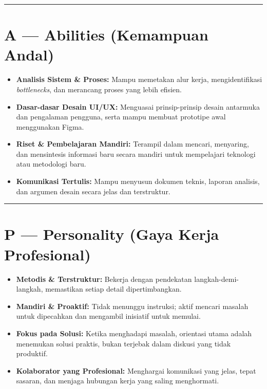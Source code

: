 \documentclass[
  letterpaper,
  DIV=11,
  numbers=noendperiod]{scrreprt}
\providecommand{\tightlist}{%
  \setlength{\itemsep}{0pt}\setlength{\parskip}{0pt}}
\begin{document}
\begin{center}\rule{0.5\linewidth}{0.5pt}\end{center}

\section{A --- Abilities (Kemampuan
Andal)}\label{a-abilities-kemampuan-andal}

\begin{itemize}
\tightlist
\item
  \textbf{Analisis Sistem \& Proses:} Mampu memetakan alur kerja,
  mengidentifikasi \emph{bottlenecks}, dan merancang proses yang lebih
  efisien.
\item
  \textbf{Dasar-dasar Desain UI/UX:} Menguasai prinsip-prinsip desain
  antarmuka dan pengalaman pengguna, serta mampu membuat prototipe awal
  menggunakan Figma.
\item
  \textbf{Riset \& Pembelajaran Mandiri:} Terampil dalam mencari,
  menyaring, dan mensintesis informasi baru secara mandiri untuk
  mempelajari teknologi atau metodologi baru.
\item
  \textbf{Komunikasi Tertulis:} Mampu menyusun dokumen teknis, laporan
  analisis, dan argumen desain secara jelas dan terstruktur.
\end{itemize}

\begin{center}\rule{0.5\linewidth}{0.5pt}\end{center}

\section{P --- Personality (Gaya Kerja
Profesional)}\label{p-personality-gaya-kerja-profesional}

\begin{itemize}
\tightlist
\item
  \textbf{Metodis \& Terstruktur:} Bekerja dengan pendekatan
  langkah-demi-langkah, memastikan setiap detail dipertimbangkan.
\item
  \textbf{Mandiri \& Proaktif:} Tidak menunggu instruksi; aktif mencari
  masalah untuk dipecahkan dan mengambil inisiatif untuk memulai.
\item
  \textbf{Fokus pada Solusi:} Ketika menghadapi masalah, orientasi utama
  adalah menemukan solusi praktis, bukan terjebak dalam diskusi yang
  tidak produktif.
\item
  \textbf{Kolaborator yang Profesional:} Menghargai komunikasi yang
  jelas, tepat sasaran, dan menjaga hubungan kerja yang saling
  menghormati.
\end{itemize}
\end{document}
